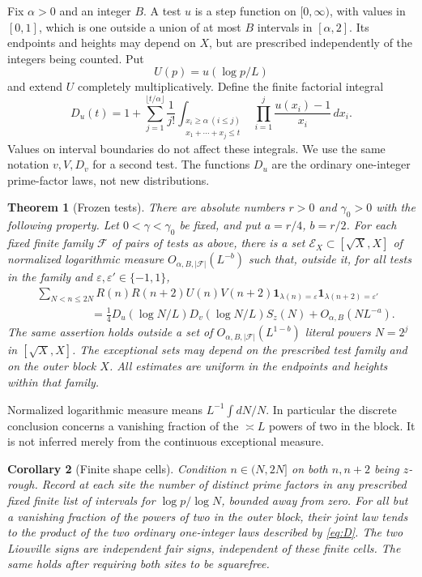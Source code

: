 \documentclass[11pt]{article}
\newtheorem{theorem}{Theorem}[section]
\newtheorem{corollary}[theorem]{Corollary}
\theoremstyle{remark}\newtheorem{remark}[theorem]{Remark}
\newcommand{\one}{\mathbf 1}
\begin{document}
Fix $\alpha>0$ and an integer $B$. A test $u$ is a step function on
$[0,\infty)$, with values in $[0,1]$, which is one outside a union of
at most $B$ intervals in $[\alpha,2]$. Its endpoints and heights may
depend on $X$, but are prescribed independently of the integers being
counted. Put
\[
 U(p)=u(\log p/L)
\]
and extend $U$ completely multiplicatively. Define the finite factorial
integral
\begin{equation}\label{eq:D}
 D_u(t)=1+\sum_{j=1}^{\lfloor t/\alpha\rfloor}\frac1{j!}
 \int_{\substack{x_i\ge\alpha\ (i\le j)\\x_1+\cdots+x_j\le t}}
            \prod_{i=1}^j\frac{u(x_i)-1}{x_i}\,dx_i.
\end{equation}
Values on interval boundaries do not affect these integrals. We use
the same notation $v,V,D_v$ for a second test. The functions $D_u$ are
the ordinary one-integer prime-factor laws, not new distributions.

\begin{theorem}[Frozen tests]\label{th:frozen}
There are absolute numbers $r>0$ and $\gamma_0>0$ with the following
property. Let $0<\gamma<\gamma_0$ be fixed, and put $a=r/4$, $b=r/2$.
For each fixed finite family $\mathcal F$ of pairs of tests as above, there is a set
$\mathcal E_X\subset[\sqrt X,X]$ of normalized logarithmic measure
$O_{\alpha,B,|\mathcal F|}(L^{-b})$ such that, outside it, for all tests in the family
and $\varepsilon,\varepsilon'\in\{-1,1\}$,
\begin{align}
 &\sum_{N<n\le2N} R(n)R(n+2)U(n)V(n+2)
      \one_{\lambda(n)=\varepsilon}\one_{\lambda(n+2)=\varepsilon'}
       \nonumber\\
 &\hspace{2cm}=\frac14 D_u(\log N/L)D_v(\log N/L)S_z(N)
                   +O_{\alpha,B}(NL^{-a}).\label{eq:frozen}
\end{align}
The same assertion holds outside a set of $O_{\alpha,B,|\mathcal F|}(L^{1-b})$
literal powers $N=2^j$ in $[\sqrt X,X]$. The exceptional sets may
depend on the prescribed test family and on the outer block $X$.
All estimates are uniform in the endpoints and heights within that family.
\end{theorem}

Normalized logarithmic measure means $L^{-1}\int dN/N$. In particular
the discrete conclusion concerns a vanishing fraction of the
$\asymp L$ powers of two in the block. It is not inferred merely from
the continuous exceptional measure.

\begin{corollary}[Finite shape cells]\label{cor:shapes}
Condition $n\in(N,2N]$ on both $n,n+2$ being $z$-rough. Record at each
site the number of distinct prime factors in any prescribed fixed
finite list of intervals for $\log p/\log N$, bounded away from zero.
For all but a vanishing fraction of the powers of two in the outer
block, their joint law tends to the product of the two ordinary
one-integer laws described by \eqref{eq:D}. The two Liouville signs
are independent fair signs, independent of these finite cells.
The same holds after requiring both sites to be squarefree.
\end{corollary}
\end{document}
